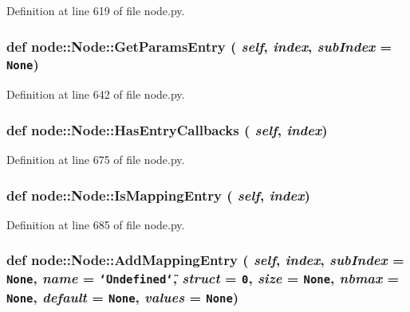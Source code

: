 Definition at line 619 of file node.py.\hypertarget{classnode_1_1Node_05f269a2d06cb100ecc0ca067beff120}{
\subsubsection[GetParamsEntry]{\setlength{\rightskip}{0pt plus 5cm}def node::Node::Get\-Params\-Entry ( {\em self},  {\em index},  {\em sub\-Index} = {\tt None})}}
\label{classnode_1_1Node_05f269a2d06cb100ecc0ca067beff120}




Definition at line 642 of file node.py.\hypertarget{classnode_1_1Node_b2d29e5f69151017745d9049435465a9}{
\subsubsection[HasEntryCallbacks]{\setlength{\rightskip}{0pt plus 5cm}def node::Node::Has\-Entry\-Callbacks ( {\em self},  {\em index})}}
\label{classnode_1_1Node_b2d29e5f69151017745d9049435465a9}




Definition at line 675 of file node.py.\hypertarget{classnode_1_1Node_70ddff5dfe732ec17f4781133ec96cf1}{
\subsubsection[IsMappingEntry]{\setlength{\rightskip}{0pt plus 5cm}def node::Node::Is\-Mapping\-Entry ( {\em self},  {\em index})}}
\label{classnode_1_1Node_70ddff5dfe732ec17f4781133ec96cf1}




Definition at line 685 of file node.py.\hypertarget{classnode_1_1Node_dec00c90a5f22d924f2ef430dec759e1}{
\subsubsection[AddMappingEntry]{\setlength{\rightskip}{0pt plus 5cm}def node::Node::Add\-Mapping\-Entry ( {\em self},  {\em index},  {\em sub\-Index} = {\tt None},  {\em name} = {\tt \char`\"{}Undefined\char`\"{}},  {\em struct} = {\tt 0},  {\em size} = {\tt None},  {\em nbmax} = {\tt None},  {\em default} = {\tt None},  {\em values} = {\tt None})}}
\label{classnode_1_1Node_dec00c90a5f22d924f2ef430dec759e1}




